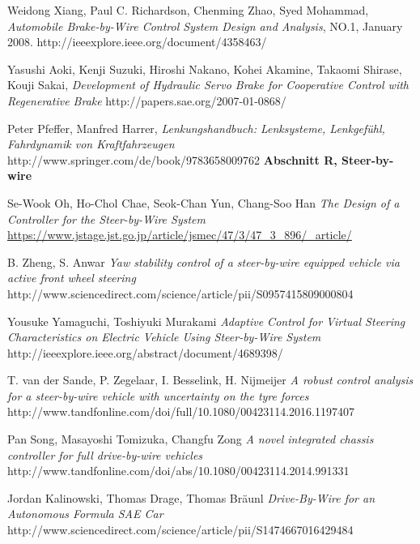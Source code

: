 \documentclass[conference]{IEEEtran}
\begin{document}
\begin{thebibliography}{1}
Weidong Xiang, Paul C. Richardson, Chenming Zhao, Syed Mohammad, 
\emph{Automobile Brake-by-Wire Control System Design and Analysis}, 
NO.1, January 2008.
http://ieeexplore.ieee.org/document/4358463/

Yasushi Aoki, Kenji Suzuki, Hiroshi Nakano, Kohei Akamine, Takaomi Shirase, Kouji Sakai, 
\emph{Development of Hydraulic Servo Brake for Cooperative Control with Regenerative Brake}
http://papers.sae.org/2007-01-0868/

Peter Pfeffer, Manfred Harrer, \emph{Lenkungshandbuch: Lenksysteme, Lenkgefühl, Fahrdynamik von Kraftfahrzeugen} http://www.springer.com/de/book/9783658009762
\textbf{Abschnitt R, Steer-by-wire}

Se-Wook Oh, Ho-Chol Chae, Seok-Chan Yun, Chang-Soo Han
\emph{The Design of a Controller for the Steer-by-Wire System}
\url{https://www.jstage.jst.go.jp/article/jsmec/47/3/47_3_896/_article/}

B. Zheng, S. Anwar
\emph{Yaw stability control of a steer-by-wire equipped vehicle via active front wheel steering}
http://www.sciencedirect.com/science/article/pii/S0957415809000804

Yousuke Yamaguchi, Toshiyuki Murakami
\emph{Adaptive Control for Virtual Steering Characteristics on Electric Vehicle Using Steer-by-Wire System}
http://ieeexplore.ieee.org/abstract/document/4689398/

T. van der Sande, P. Zegelaar, I. Besselink, H. Nijmeijer
\emph{A robust control analysis for a steer-by-wire vehicle with uncertainty on the tyre forces}
http://www.tandfonline.com/doi/full/10.1080/00423114.2016.1197407

Pan Song, Masayoshi Tomizuka, Changfu Zong
\emph{A novel integrated chassis controller for full drive-by-wire vehicles}
http://www.tandfonline.com/doi/abs/10.1080/00423114.2014.991331

Jordan Kalinowski, Thomas Drage, Thomas Bräunl
\emph{Drive-By-Wire for an Autonomous Formula SAE Car}
http://www.sciencedirect.com/science/article/pii/S1474667016429484



\end{thebibliography}
\end{document}
